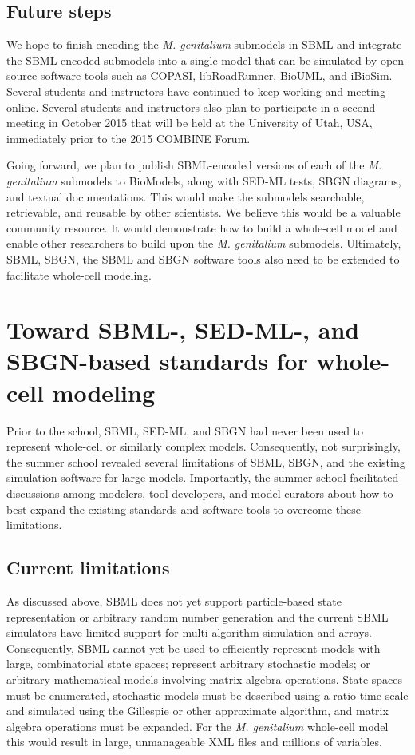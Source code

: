 \documentclass[journal,transmag]{IEEEtran}
\begin{document}
\subsection{Future steps}
We hope to finish encoding the \textit{M. genitalium} submodels in SBML and integrate the SBML-encoded submodels into a single model that can be simulated by open-source software tools such as COPASI, libRoadRunner, BioUML, and iBioSim. Several students and instructors have continued to keep working and meeting online. Several students and instructors also plan to participate in a second meeting in October 2015 that will be held at the University of Utah, USA, immediately prior to the 2015 COMBINE Forum.

Going forward, we plan to publish SBML-encoded versions of each of the \textit{M. genitalium} submodels to BioModels, along with SED-ML tests, SBGN diagrams, and textual documentations. This would make the submodels searchable, retrievable, and reusable by other scientists. We believe this would be a valuable community resource. It would demonstrate how to build a whole-cell model and enable other researchers to build upon the \textit{M. genitalium} submodels. Ultimately, SBML, SBGN, the SBML and SBGN software tools also need to be extended to facilitate whole-cell modeling.

\section{Toward SBML-, SED-ML-, and SBGN-based standards for whole-cell modeling}
Prior to the school, SBML, SED-ML, and SBGN had never been used to represent whole-cell or similarly complex models. Consequently, not surprisingly, the summer school revealed several limitations of SBML, SBGN, and the existing simulation software for large models. Importantly, the summer school facilitated discussions among modelers, tool developers, and model curators about how to best expand the existing standards and software tools to overcome these limitations.

\subsection{Current limitations}
As discussed above, SBML does not yet support particle-based state representation or arbitrary random number generation and the current SBML simulators have limited support for multi-algorithm simulation and arrays. Consequently, SBML cannot yet be used to efficiently represent models with large, combinatorial state spaces; represent arbitrary stochastic models; or arbitrary mathematical models involving matrix algebra operations. State spaces must be enumerated, stochastic models must be described using a ratio time scale and simulated using the Gillespie or other approximate algorithm, and matrix algebra operations must be expanded. For the \textit{M. genitalium} whole-cell model this would result in large, unmanageable XML files and millions of variables.
\end{document}
